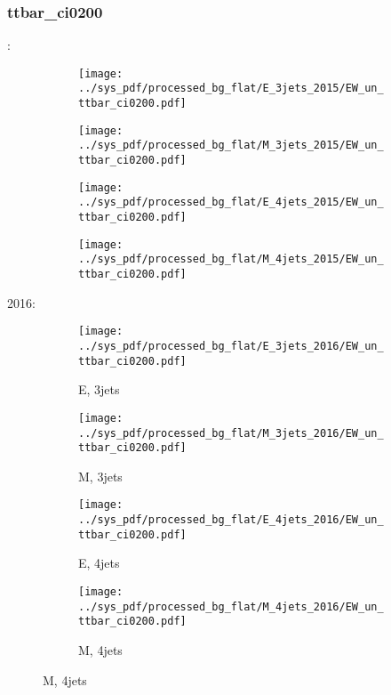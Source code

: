 \documentclass{beamer}
\begin{document}
\begin{frame}
\frametitle{ttbar_ci0200}
\fontsize{5}{1}:
\begin{figure}
\centering
\begin{subfigure}[b]{0.24\textwidth}
\texttt{[image: ../sys\_pdf/processed\_bg\_flat/E\_3jets\_2015/EW\_un\_ttbar\_ci0200.pdf]}
\end{subfigure}
\begin{subfigure}[b]{0.24\textwidth}
\texttt{[image: ../sys\_pdf/processed\_bg\_flat/M\_3jets\_2015/EW\_un\_ttbar\_ci0200.pdf]}
\end{subfigure}
\begin{subfigure}[b]{0.24\textwidth}
\texttt{[image: ../sys\_pdf/processed\_bg\_flat/E\_4jets\_2015/EW\_un\_ttbar\_ci0200.pdf]}
\end{subfigure}
\begin{subfigure}[b]{0.24\textwidth}
\texttt{[image: ../sys\_pdf/processed\_bg\_flat/M\_4jets\_2015/EW\_un\_ttbar\_ci0200.pdf]}
\end{subfigure}
\end{figure}
2016:
\begin{figure}
\centering
\begin{subfigure}[b]{0.24\textwidth}
\texttt{[image: ../sys\_pdf/processed\_bg\_flat/E\_3jets\_2016/EW\_un\_ttbar\_ci0200.pdf]}
\captionsetup{font=tiny}
\caption{E, 3jets}
\end{subfigure}
\begin{subfigure}[b]{0.24\textwidth}
\texttt{[image: ../sys\_pdf/processed\_bg\_flat/M\_3jets\_2016/EW\_un\_ttbar\_ci0200.pdf]}
\captionsetup{font=tiny}
\caption{M, 3jets}
\end{subfigure}
\begin{subfigure}[b]{0.24\textwidth}
\texttt{[image: ../sys\_pdf/processed\_bg\_flat/E\_4jets\_2016/EW\_un\_ttbar\_ci0200.pdf]}
\captionsetup{font=tiny}
\caption{E, 4jets}
\end{subfigure}
\begin{subfigure}[b]{0.24\textwidth}
\texttt{[image: ../sys\_pdf/processed\_bg\_flat/M\_4jets\_2016/EW\_un\_ttbar\_ci0200.pdf]}
\captionsetup{font=tiny}
\caption{M, 4jets}
\end{subfigure}
\end{figure}
\end{frame}
\end{document}
